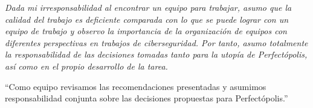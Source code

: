 
\vspace{1cm}
\begin{center}
    \begin{minipage}{0.9\textwidth}
        \centering
        \itshape
	    Dada mi irresponsabilidad al encontrar un equipo para trabajar, asumo que la calidad del trabajo es deficiente comparada con lo que se puede lograr con un equipo de trabajo y observo la importancia de la organización de equipos con diferentes perspectivas en trabajos de ciberseguridad. Por tanto, asumo totalmente la responsabilidad de las decisiones tomadas tanto para la utopía de Perfectópolis, así como en el propio desarrollo de la tarea.

	    
        ``Como equipo revisamos las recomendaciones presentadas y asumimos responsabilidad conjunta sobre las decisiones propuestas para Perfectópolis.''
    \end{minipage}
\end{center}
\vspace{1.5cm}

